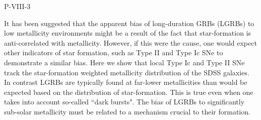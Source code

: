 P-VIII-3


\bigskip



\bigskip

\noindent It has been suggested that the apparent bias of long-duration GRBs (LGRBs) to low metallicity environments might be a result of the fact that star-formation is anti-correlated with metallicity.   However, if this were the cause, one would expect other indicators of star formation, such as Type II and Type Ic SNe to demonstrate a similar bias.  Here we show that local Type Ic and Type II SNe track the star-formation weighted metallicity distribution of the SDSS galaxies.  In contrast LGRBs are typically found at far-lower metallicities than would be expected based on the distribution of star-formation.   This is true even when one takes into account so-called ``dark bursts".  The bias of LGRBs to significantly sub-solar metallicity must be related to a mechanism crucial to their formation.

